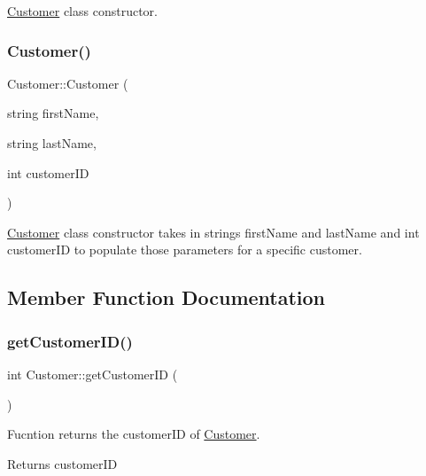 \hyperlink{class_customer}{Customer} class constructor. \mbox{\label{class_customer_a0e0e31707d01bf721067c7a73b5bea8c}} 
\subsubsection{\texorpdfstring{Customer()}{Customer()}\hspace{0.1cm}{\footnotesize\ttfamily [2/2]}}
{\footnotesize\ttfamily Customer\+::\+Customer (\begin{DoxyParamCaption}\item[{string}]{first\+Name,  }\item[{string}]{last\+Name,  }\item[{int}]{customer\+ID }\end{DoxyParamCaption})}

\hyperlink{class_customer}{Customer} class constructor takes in strings first\+Name and last\+Name and int customer\+ID to populate those parameters for a specific customer. 

\subsection{Member Function Documentation}
\mbox{\label{class_customer_a236d5d040cafabeb6f84296d3e101ff1}} 
\subsubsection{\texorpdfstring{get\+Customer\+I\+D()}{getCustomerID()}}
{\footnotesize\ttfamily int Customer\+::get\+Customer\+ID (\begin{DoxyParamCaption}{ }\end{DoxyParamCaption})}

Fucntion returns the customer\+ID of \hyperlink{class_customer}{Customer}. \begin{DoxyReturn}{Returns}
customer\+ID 
\end{DoxyReturn}
\mbox{\label{class_customer_a406993fb9cf665aa2b44355de7c12d58}} 
